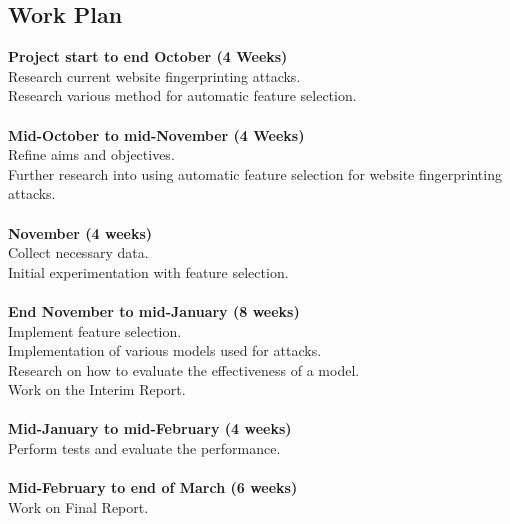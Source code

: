 \subsection{Work Plan}
  \textbf{Project start to end October (4 Weeks)}\\
  \indent Research current website fingerprinting attacks.\\
  \indent Research various method for automatic feature selection.\\
  \\
  \textbf{Mid-October to mid-November (4 Weeks)}\\
  \indent Refine aims and objectives.\\
  \indent Further research into using automatic feature selection for website fingerprinting attacks.\\
  \\
  \textbf{November (4 weeks)}\\
  \indent Collect necessary data.\\
  \indent Initial experimentation with feature selection.\\
  \\
  \textbf{End November to mid-January (8 weeks)}\\
  \indent Implement feature selection.\\
  \indent Implementation of various models used for attacks.\\
  \indent Research on how to evaluate the effectiveness of a model.\\
  \indent Work on the Interim Report.\\
  \\
  \textbf{Mid-January to mid-February (4 weeks)}\\
  \indent Perform tests and evaluate the performance.\\
  \\
  \textbf{Mid-February to end of March (6 weeks)}\\
  \indent Work on Final Report.\\
  \\

\endgroup
